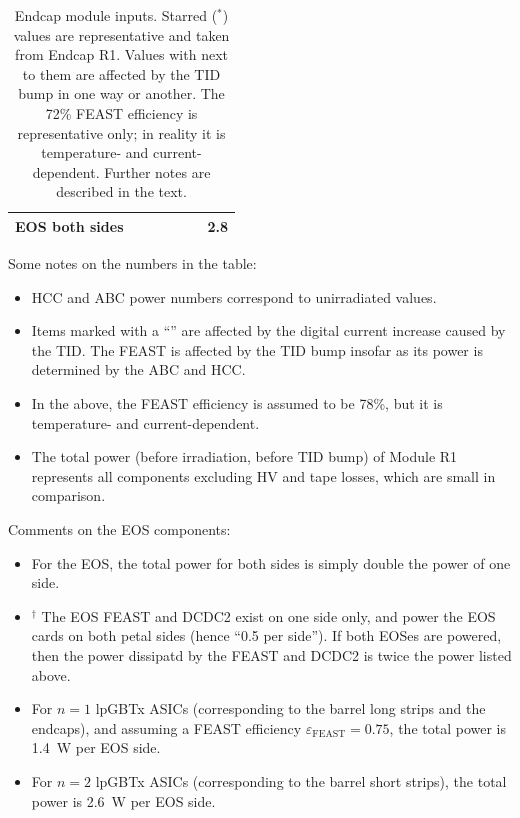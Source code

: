\begin{table}[h]
\begin{center}
{\begin{tabular}{|l|c|c|c|c|c|c|}
EOS both sides&               &                       &                             &       &                     & 2.8             \\
\hline \end{tabular}
} %
\end{center}
\caption{Endcap module inputs. Starred ($^*$) values are representative and taken from Endcap R1. Values
with \tid next to them are affected by the TID bump in one way or another. The 72\% FEAST efficiency 
is representative only; in reality it is temperature- and current-dependent. Further notes are
described in the text.
}
\label{tab:power_numbers}
\end{table}
\let\arraystretch\arraystretcha

Some notes on the numbers in the table:
\begin{itemize}
\item HCC and ABC power numbers correspond to unirradiated values.
\item Items marked with a ``\tid'' are affected by the digital current increase caused by the TID.
The FEAST is affected by the TID bump insofar as its power is determined by the ABC and HCC.
\item In the above, the FEAST efficiency is assumed to be 78\%, but it is temperature- and
current-dependent.
\item The total power (before irradiation, before TID bump) of Module R1 represents
all components excluding HV and tape losses, which are small in comparison.
\end{itemize}

\noindent
Comments on the EOS components:

\begin{itemize}
\item For the EOS, the total power for both sides is simply double the power of one side.
\item $^\dagger$ The EOS FEAST and DCDC2 exist on one side only, and power the EOS cards on both petal
sides (hence ``0.5 per side''). If both EOSes are powered, then the power dissipatd by the FEAST and
DCDC2 is twice the power listed above.
\item For $n=1$ lpGBTx ASICs (corresponding to the barrel long strips and the endcaps),
and assuming a FEAST efficiency $\varepsilon_\text{FEAST}=0.75$,
the total power is 1.4~W per EOS side.
\item For $n=2$ lpGBTx ASICs (corresponding to the barrel short strips), the total power is 2.6~W per
EOS side.
\end{itemize}

